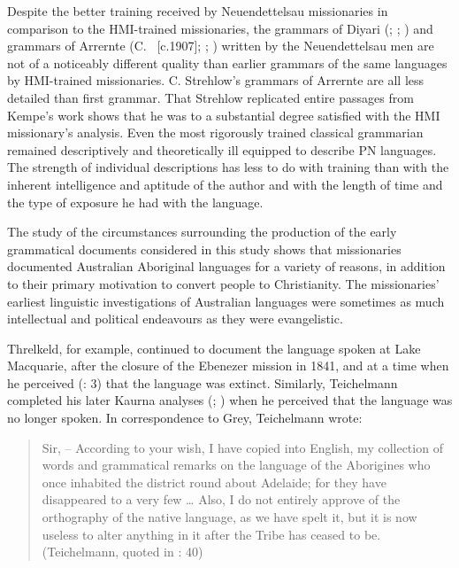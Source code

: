 Despite the better training received by Neuendettelsau missionaries in comparison to the HMI-trained missionaries, the grammars of Diyari (\citealt{flierl_dieri_1880}; \citealt{reuther_dieri_1894}; \citeyear{reuther_ms_1899}) and grammars of Arrernte (C. \citet{strehlow_untitled_1931}~[c.1907]; \citeyear{strehlow_einige_1908}; \citeyear{strehlow_notitle_1910}) written by the Neuendettelsau men are not of a noticeably different quality than earlier grammars of the same languages by HMI-trained missionaries. C. Strehlow’s grammars of Arrernte are all less detailed than  first grammar. That Strehlow replicated entire passages from Kempe’s work shows that he was to a substantial degree satisfied with the HMI missionary’s analysis. Even the most rigorously trained classical grammarian remained descriptively and theoretically ill equipped to describe PN languages. The strength of individual descriptions has less to do with training than with the inherent intelligence and aptitude of the author and with the length of time and the type of exposure he had with the language.

The study of the circumstances surrounding the production of the early grammatical documents considered in this study shows that missionaries documented Australian Aboriginal languages for a variety of reasons, in addition to their primary motivation to convert people to Christianity. The missionaries' earliest linguistic investigations of Australian languages were sometimes as much intellectual and political endeavours as they were evangelistic.

Threlkeld, for example, continued to document the language spoken at Lake Macquarie, after the closure of the Ebenezer mission in 1841, and at a time when he perceived (\citeyear{threlkeld_key_1850}: 3) that the language was extinct. Similarly, Teichelmann completed his later Kaurna analyses (\citeyear{teichelmann_dictionary_1857}; \citeyear{teichelmann_verb_1858}) when he perceived that the language was no longer spoken. In correspondence to Grey, Teichelmann wrote:

\begin{quote}
	Sir, – According to your wish, I have copied into English, my collection of words and grammatical remarks on the language of the Aborigines who once inhabited the district round about Adelaide; for they have disappeared to a very few … Also, I do not entirely approve of the orthography of the native language, as we have spelt it, but it is now useless to alter anything in it after the Tribe has ceased to be. (Teichelmann, quoted in \citealt{bleek_library_1858}: 40)
\end{quote}

